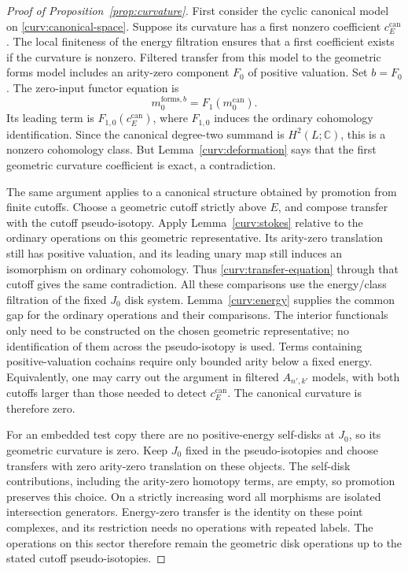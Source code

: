 \documentclass[11pt]{article}
\numberwithin{equation}{section}
\theoremstyle{definition}
\theoremstyle{remark}
\newcommand{\C}{\mathbb C}
\begin{document}
\begin{proof}[Proof of Proposition~\ref{prop:curvature}]
First consider the cyclic canonical model on
\eqref{curv:canonical-space}.  Suppose its curvature has a first
nonzero coefficient $c_E^{\mathrm{can}}$.  The local finiteness of
the energy filtration ensures that a first coefficient exists if the
curvature is nonzero.  Filtered transfer from this model to the
geometric forms model includes an arity-zero component $F_0$ of
positive valuation.  Set $b=F_0$.  The zero-input functor equation is
\begin{equation}\label{curv:transfer-equation}
 m_0^{\mathrm{forms},b}
       =F_1(m_0^{\mathrm{can}}).
\end{equation}
Its leading term is
$F_{1,0}(c_E^{\mathrm{can}})$, where $F_{1,0}$ induces the ordinary
cohomology identification.  Since the canonical degree-two summand
is $H^2(L;\C)$, this is a nonzero cohomology class.  But
Lemma~\ref{curv:deformation} says that the first geometric curvature
coefficient is exact, a contradiction.

The same argument applies to a canonical structure obtained by
promotion from finite cutoffs.  Choose a geometric cutoff strictly above $E$, and compose transfer
with the cutoff pseudo-isotopy.  Apply Lemma~\ref{curv:stokes}
relative to the ordinary operations on this geometric representative.  Its arity-zero
translation still has positive valuation, and its leading unary map
still induces an isomorphism on ordinary cohomology.  Thus
\eqref{curv:transfer-equation} through that cutoff gives the same
contradiction.  All these comparisons use the energy/class filtration
of the fixed $J_0$ disk system.  Lemma~\ref{curv:energy} supplies the common gap for the ordinary
operations and their comparisons.  The interior functionals only
need to be constructed on the chosen geometric representative; no
identification of them across the pseudo-isotopy is used.  Terms containing positive-valuation cochains require
only bounded arity below a fixed energy.  Equivalently, one may carry
out the argument in filtered $A_{n',k'}$ models, with both cutoffs
larger than those needed to detect $c_E^{\mathrm{can}}$.
The canonical curvature is therefore zero.

For an embedded test copy there are no positive-energy self-disks
at $J_0$, so its geometric curvature is zero.  Keep $J_0$ fixed in
the pseudo-isotopies and choose transfers with zero arity-zero
translation on these objects.  The self-disk contributions, including
the arity-zero homotopy terms, are empty, so promotion preserves this
choice.  On a strictly increasing word all morphisms are isolated
intersection generators.  Energy-zero transfer is the identity on
these point complexes, and its restriction needs no operations with
repeated labels.  The operations on this sector therefore remain the
geometric disk operations up to the stated cutoff pseudo-isotopies.


\end{proof}
\end{document}
